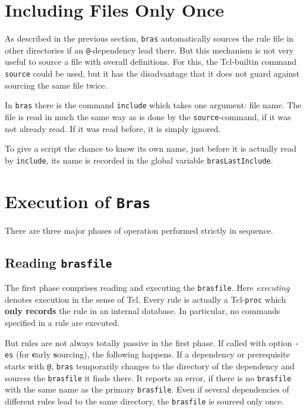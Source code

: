 \documentclass[12pt]{article}
\newcommand{\bras}{\texttt{bras}}
\newcommand{\Bras}{\texttt{Bras}}
\begin{document}
\section{Including Files Only Once}

As described in the previous section, \bras{} automatically sources
the rule file in other directories if an \texttt{@}-dependency lead
there. But this mechanism is not very useful to source a file with
overall definitions. For this, the Tcl-builtin command
\texttt{source} could be used, but it has the disadvantage that it
does not guard against sourcing the same file twice.

In \bras{} there is the command \texttt{include} which takes one
argument: file name. The file is read in much the same way as is done
by the \texttt{source}-command, if it was not already read. If it was
read before, it is simply ignored.

To give a script the chance to know its own name, just before it is
actually read by \texttt{include}, its name is recorded in the global
variable \texttt{brasLastInclude}. 

\section{Execution of \Bras}

There are three major phases of operation performed strictly in
sequence.

\subsection{Reading \texttt{brasfile}}
The first phase comprises reading and executing the
\texttt{brasfile}. Here \textit{executing} 
denotes execution in the sense of Tcl. Every rule is actually a
Tcl-\texttt{proc} which \textbf{only records} the rule in an internal
database. In particular, no commands specified in a rule are
executed. 

But rules are not always totally passive in the first phase. 
If called with option \texttt{-es} (for \textbf{e}arly
\textbf{s}ourcing), the following happens.
If a dependency or prerequisite starts with \texttt{@}, \bras{}
temporarily changes to the directory of the dependency and sources the
\texttt{brasfile} it finds there. It reports an error, if there is no
\texttt{brasfile} with the same name as the primary
\texttt{brasfile}. Even if several dependencies of different rules lead
to the same directory, the \texttt{brasfile} is sourced only once.
\end{document}
